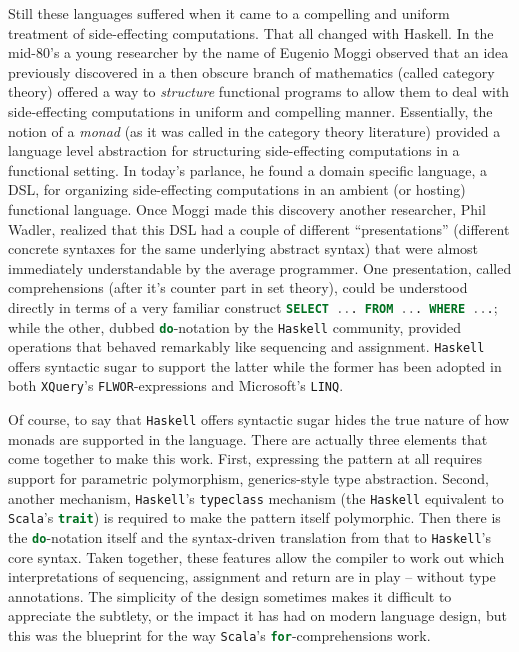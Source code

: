 Still these languages suffered when it came to a compelling and
uniform treatment of side-effecting computations. That all changed
with Haskell. In the mid-80's a young researcher by the name of
Eugenio Moggi observed that an idea previously discovered in a then
obscure branch of mathematics (called category theory) offered a way
to \emph{structure} functional programs to allow them to deal with
side-effecting computations in uniform and compelling
manner. Essentially, the notion of a \emph{monad} (as it was called in
the category theory literature) provided a language level abstraction
for structuring side-effecting computations in a functional
setting. In today's parlance, he found a domain specific language, a
DSL, for organizing side-effecting computations in an ambient (or
hosting) functional language. Once Moggi made this discovery another
researcher, Phil Wadler, realized that this DSL had a couple of
different ``presentations'' (different concrete syntaxes for the same
underlying abstract syntax) that were almost immediately
understandable by the average programmer. One presentation, called
comprehensions (after it's counter part in set theory), could be
understood directly in terms of a very familiar construct
\lstinline[language=SQL]!SELECT ... FROM ... WHERE ...!; while the
other, dubbed \lstinline[language=Haskell]!do!-notation by the
\texttt{Haskell} community, provided operations that behaved
remarkably like sequencing and assignment. \texttt{Haskell} offers
syntactic sugar to support the latter while the former has been
adopted in both \texttt{XQuery}'s
\lstinline[language=XML]!FLWOR!-expressions and Microsoft's
\texttt{LINQ}.

Of course, to say that \texttt{Haskell} offers syntactic sugar hides
the true nature of how monads are supported in the language. There are
actually three elements that come together to make this work. First,
expressing the pattern at all requires support for parametric
polymorphism, generics-style type abstraction. Second, another
mechanism, \texttt{Haskell}'s \lstinline[language=Haskell]!typeclass!
mechanism (the \texttt{Haskell} equivalent to \texttt{Scala}'s
\lstinline[language=Scala]!trait!) is required to make the pattern
itself polymorphic. Then there is the
\lstinline[language=Haskell]!do!-notation itself and the syntax-driven
translation from that to \texttt{Haskell}'s core syntax. Taken
together, these features allow the compiler to work out which
interpretations of sequencing, assignment and return are in play --
without type annotations. The simplicity of the design sometimes makes
it difficult to appreciate the subtlety, or the impact it has had on
modern language design, but this was the blueprint for the way
\texttt{Scala}'s \lstinline[language=Scala]!for!-comprehensions work.

